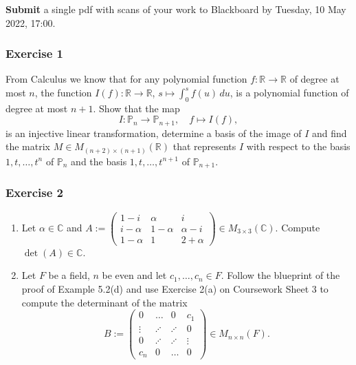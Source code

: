 \documentclass[
  12pt,
  a4paper,
  twoside]{article}
\theoremstyle{plain}
\theoremstyle{definition}
\begin{document}
\textbf{Submit} a single pdf with scans of your work to Blackboard by Tuesday, 10 May 2022, 17:00.

\hypertarget{exercise-1-7}{%
\subsubsection*{Exercise 1}\label{exercise-1-7}}

From Calculus we know that for any polynomial function \(f: \mathbb{R} \rightarrow \mathbb{R}\) of degree at most \(n\), the function \(I(f): \mathbb{R} \rightarrow \mathbb{R}\), \(s \mapsto \int_0^s f(u)\, du\), is a polynomial
function of degree at most \(n+1\). Show that the map
\[I: \mathbb{P}_n \rightarrow \mathbb{P}_{n+1}, \quad f \mapsto I(f),\]
is an injective linear transformation, determine a basis of the
image of \(I\) and find the matrix \(M\in M_{(n+2)\times(n+1)}(\mathbb{R})\)
that represents \(I\) with respect to the basis \(1, t, \ldots, t^n\)
of \(\mathbb{P}_n\) and the basis \(1, t, \ldots, t^{n+1}\) of \(\mathbb{P}_{n+1}\).

\hypertarget{exercise-2-7}{%
\subsubsection*{Exercise 2}\label{exercise-2-7}}

\begin{enumerate}
\def\labelenumi{(\alph{enumi})}
\item
  Let \(\alpha \in \mathbb{C}\) and \(A:= \left(\begin{array}{ccc} 1-i & \alpha & i \\ i-\alpha & 1 - \alpha & \alpha -i \\ 1- \alpha & 1 & 2+ \alpha \end{array}\right) \in M_{3 \times 3}(\mathbb{C})\). Compute
  \(\det(A) \in \mathbb{C}\).
\item
  Let \(F\) be a field, \(n\) be even and let \(c_1, \ldots, c_n \in F\). Follow
  the blueprint of the proof of Example 5.2(d) and use Exercise 2(a) on
  Coursework Sheet 3 to compute the determinant of the matrix
  \[B:= \left(\begin{array}{cccc} 0 &
  \ldots & 0 & c_1 \\ \vdots & \iddots & \iddots & 0 \\ 0 & \iddots
  & \iddots & \vdots \\ c_n & 0 & \ldots & 0 \end{array}\right)
  \in M_{n \times n}(F).\]
\end{enumerate}
\end{document}
